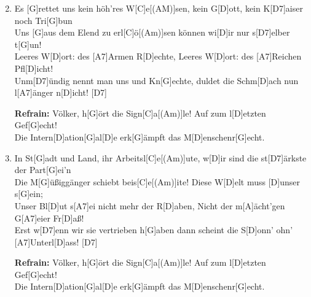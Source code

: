 \begin{guitarMagic}
    \begin{enumerate}
        \setcounter{enumi}{1} %
        \liedweiter

        \item Es [G]rettet uns kein höh’res W[C]e[(AM)]sen, 
            kein G[D]ott, kein K[D7]aiser noch Tri[G]bun \\
            Uns [G]aus dem Elend zu erl[C]{\"o}[(Am)]sen 
            können wi[D]ir nur s[D7]elber t[G]un! \\
            Leeres W[D]ort: des [A7]Armen R[D]echte, 
            Leeres W[D]ort: des [A7]Reichen Pfl[D]icht! \\
            Unm[D7]{\"u}ndig nennt man uns und Kn[G]echte, 
            duldet die Schm[D]ach nun l[A7]{\"a}nger n[D]icht! [D7]

        \textbf{Refrain:}
            \leftrepeat Völker, h[G]{\"o}rt die Sign[C]a[(Am)]le!
            Auf zum l[D]etzten Gef[G]echt! \\
            Die Intern[D]ation[G]al[D]e
            erk[G]{\"a}mpft das M[D]enschenr[G]echt. \rightrepeat


        \item In St[G]adt und Land, ihr Arbeitsl[C]e[(Am)]ute,
            w[D]ir sind die st[D7]{\"a}rkste der Part[G]ei’n \\
            Die M[G]{\"u}{\ss}iggänger schiebt beis[C]e[(Am)]ite! 
            Diese W[D]elt muss [D]unser s[G]ein; \\
            Unser Bl[D]ut s[A7]ei nicht mehr der R[D]aben, 
            Nicht der m[A]{\"a}cht’gen G[A7]eier Fr[D]aß! \\
            Erst w[D7]enn wir sie vertrieben h[G]aben 
            dann scheint die S[D]onn’ ohn’ [A7]Unterl[D]ass! [D7]

        \textbf{Refrain:}
            \leftrepeat Völker, h[G]{\"o}rt die Sign[C]a[(Am)]le!
            Auf zum l[D]etzten Gef[G]echt! \\
            Die Intern[D]ation[G]al[D]e
            erk[G]{\"a}mpft das M[D]enschenr[G]echt. \rightrepeat


    \end{enumerate}
\end{guitarMagic}



